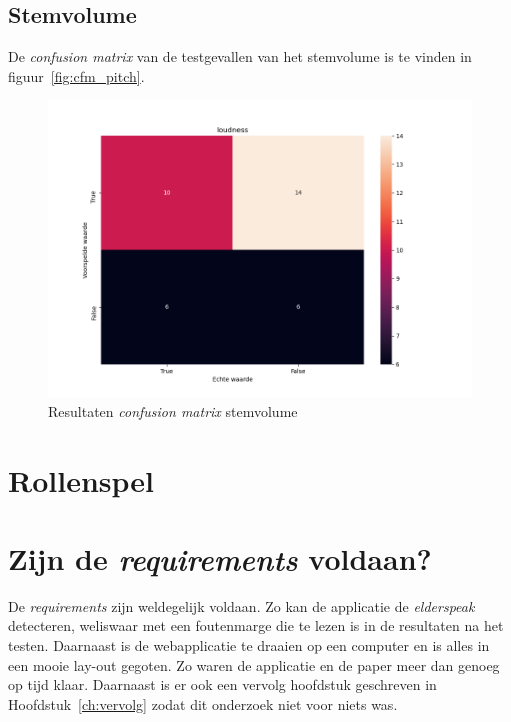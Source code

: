 \subsection{Stemvolume}

De \textit{confusion matrix} van de testgevallen van het stemvolume is te vinden in figuur~\ref{fig:cfm_pitch}.
\begin{figure}
	\centering
	\includegraphics[width=1\textwidth]{./img/cfm_loudness}
	\caption{\label{fig:cfm_loudness} Resultaten \textit{confusion matrix} stemvolume}
\end{figure}


\section{Rollenspel}



\section{Zijn de \textit{requirements} voldaan?}
De \textit{requirements} zijn weldegelijk voldaan. Zo kan de applicatie de \textit{elderspeak} detecteren, weliswaar met een foutenmarge die te lezen is in de resultaten na het testen.
Daarnaast is de webapplicatie te draaien op een computer en is alles in een mooie lay-out gegoten.
Zo waren de applicatie en de paper meer dan genoeg op tijd klaar. Daarnaast is er ook een vervolg hoofdstuk geschreven in Hoofdstuk~\ref{ch:vervolg} zodat dit onderzoek niet voor niets was.
